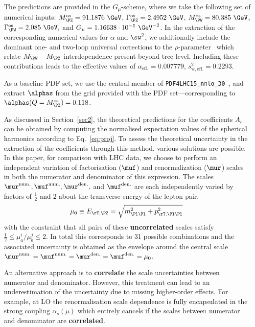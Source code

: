 The predictions are provided in the $G_\mu$-scheme, where we take the following
set of numerical inputs: $M_{\PZ}^\mathrm{os} = 91.1876~\GeV$, $\Gamma_{\PZ}^\mathrm{os} = 2.4952~\GeV$, 
$M_{\PW}^\mathrm{os} = 80.385~\GeV$,  $\Gamma_{\PW}^\mathrm{os} = 2.085~\GeV,$ 
and $G_\mu = 1.16638 \cdot 10^{-5}~\GeV^{-2}$. In the extraction of the corresponding numerical values 
for $\alpha$ and $\sw^2$, 
we additionally include the dominant one- and two-loop universal corrections to the $\rho$-parameter~\cite{Fleischer:1993ub}
which relate $M_{\PW}-M_{\PZ}$ interdependence present beyond tree-level. Including these 
contributions leads to the effective values of $\alpha_\mathrm{eff.} = 0.007779$, $s_{\mathrm{w,eff.}}^2 = 0.2293$.

As a baseline PDF set, we use the central member of \verb|PDF4LHC15_nnlo_30|~\cite{Butterworth:2015oua,
Dulat:2015mca,Harland-Lang:2014zoa,Ball:2014uwa,Gao:2013bia,Carrazza:2015aoa}, and extract $\alphas$ from the grid provided with the PDF set---corresponding to $\alphas(Q=M_{\PZ}^\mathrm{os}) = 0.118$.

As discussed in Section~\ref{sec2}, the theoretical predictions for the coefficients $A_i$ can be obtained by computing the normalised expectation values of the spherical harmonics according to Eq.~\eqref{eq:proj}. To assess the theoretical uncertainty in the extraction of the coefficients through this method, various solutions are possible. In this paper, for comparison with LHC data, we choose to perform an independent variation of factorisation ($\muf$) and renormalization ($\mur$) scales in both the numerator and denominator of this expression.
%
The scales $\mur^{\rm{num.}}, \muf^{\rm{num.}}, \mur^{\rm{den.}},$ and $\muf^{\rm{den.}}$ are each independently varied by factors of $\tfrac{1}{2}$ and $2$ about the transverse energy of the lepton pair,
\begin{equation}
  \mu_0 \equiv E_{\rT,\PZ} = \sqrt{m_{\Pl\Pl}^2 + p_{\rT,\Pl\Pl}^2} \,
\end{equation}
with the constraint that all pairs of these \textbf{uncorrelated} scales satisfy $\tfrac{1}{2} \leq \mu^{i}_{a}/\mu^{j}_{b} \leq 2$.
In total this corresponds to 31 possible combinations and the associated uncertainty is obtained as 
the envelope around the central scale $\mur^{\rm{num.}} = \muf^{\rm{num.}} = \mur^{\rm{den.}} = \muf^{\rm{den.}}  = \mu_0$.

An alternative approach is to \textbf{correlate} the scale uncertainties between numerator and denominator. However, this
treatment can lead to an underestimation of the uncertainty due to missing higher-order effects. For example, 
at LO the renormalisation scale dependence is fully encapsulated in the strong coupling $\alpha_s(\mu)$ which entirely cancels
if the scales between numerator and denominator are \textbf{correlated}.


